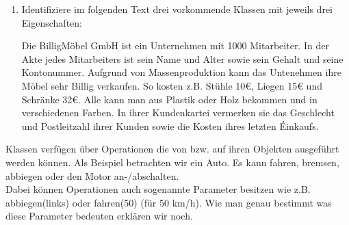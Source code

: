 \begin{enumerate}
    \item Identifiziere im folgenden Text drei vorkommende Klassen mit jeweils drei Eigenschaften:

    Die BilligMöbel GmbH ist ein Unternehmen mit 1000 Mitarbeiter.
    In der Akte jedes Mitarbeiters ist sein Name und Alter sowie sein Gehalt und seine Kontonummer.
    Aufgrund von Massenproduktion  kann das Untenehmen ihre Möbel sehr Billig verkaufen.
    So kosten z.B. Stühle 10€, Liegen 15€ und Schränke 32€.
    Alle kann man aus Plastik oder Holz bekommen und in verschiedenen Farben.
    In ihrer Kundenkartei vermerken sie das Geschlecht und Postleitzahl ihrer Kunden sowie die Kosten ihres letzten Éinkaufs.
\end{enumerate}

\begin{Infobox}
    Klassen verfügen über Operationen die von bzw. auf ihren Objekten ausgeführt werden können.
    Als Beispiel betrachten wir ein Auto. Es kann fahren, bremsen, abbiegen oder den Motor an-/abschalten.\\

    Dabei können Operationen auch sogenannte Parameter besitzen wie z.B. abbiegen(links) oder fahren(50) (für 50 km/h).
    Wie man genau bestimmt was diese Parameter bedeuten erklären wir noch.
\end{Infobox}

